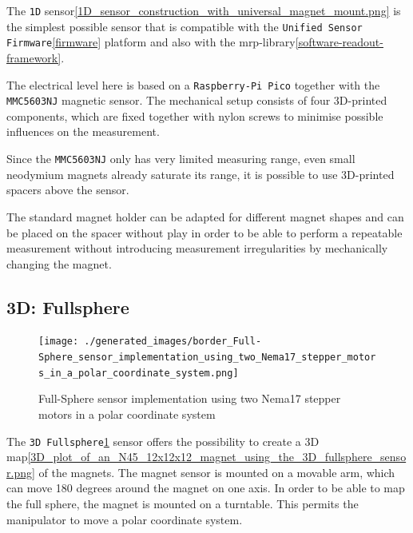 The \passthrough{\lstinline!1D!}
sensor\ref{1D_sensor_construction_with_universal_magnet_mount.png} is
the simplest possible sensor that is compatible with the
\passthrough{\lstinline!Unified Sensor Firmware!}\ref{firmware} platform
and also with the \gls{mrp}-library\ref{software-readout-framework}.

The electrical level here is based on a
\passthrough{\lstinline!Raspberry-Pi Pico!} together with the
\passthrough{\lstinline!MMC5603NJ!} magnetic sensor. The mechanical
setup consists of four 3D-printed components, which are fixed together
with nylon screws to minimise possible influences on the measurement.

Since the \passthrough{\lstinline!MMC5603NJ!} only has very limited
measuring range, even small neodymium magnets already saturate its
range, it is possible to use 3D-printed spacers above the sensor.

The standard magnet holder can be adapted for different magnet shapes
and can be placed on the spacer without play in order to be able to
perform a repeatable measurement without introducing measurement
irregularities by mechanically changing the magnet.

\hypertarget{d-fullsphere}{%
\subsection{3D: Fullsphere}\label{d-fullsphere}}

\begin{figure}
\centering
\texttt{[image: ./generated\_images/border\_Full-Sphere\_sensor\_implementation\_using\_two\_Nema17\_stepper\_motors\_in\_a\_polar\_coordinate\_system.png]}
\caption{Full-Sphere sensor implementation using two Nema17 stepper
motors in a polar coordinate system
\label{Full-Sphere_sensor_implementation_using_two_Nema17_stepper_motors_in_a_polar_coordinate_system.png}}
\end{figure}

The
\passthrough{\lstinline!3D Fullsphere!}\ref{Full-Sphere_sensor_implementation_using_two_Nema17_stepper_motors_in_a_polar_coordinate_system.png}
sensor offers the possibility to create a 3D
map\ref{3D_plot_of_an_N45_12x12x12_magnet_using_the_3D_fullsphere_sensor.png}
of the magnets. The magnet sensor is mounted on a movable arm, which can
move 180 degrees around the magnet on one axis. In order to be able to
map the full sphere, the magnet is mounted on a turntable. This permits
the manipulator to move a polar coordinate system.

